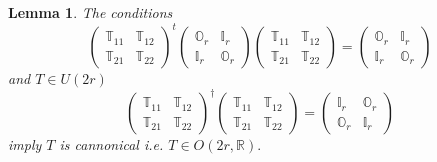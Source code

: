 \documentclass[aps, preprint]{revtex4}
\newtheorem{lemma}[theorem]{Lemma}
\begin{document}
\begin{lemma}
The conditions
\begin{equation}\left (\begin{array}{cc}\mathbb{T}_{1 1} & \mathbb{T}_{1 2} \\
\mathbb{T}_{2 1} & \mathbb{T}_{2 2}\end{array}\right )^{t} \left (\begin{array}{cc}\mathbb{O}_{r} & \mathbb{I}_{r} \\
\mathbb{I}_{r} & \mathbb{O}_{r}\end{array}\right ) \left (\begin{array}{cc}\mathbb{T}_{1 1} & \mathbb{T}_{1 2} \\
\mathbb{T}_{2 1} & \mathbb{T}_{2 2}\end{array}\right ) =\left (\begin{array}{cc}\mathbb{O}_{r} & \mathbb{I}_{r} \\
\mathbb{I}_{r} & \mathbb{O}_{r}\end{array}\right )
\end{equation}and $T \in U \left (2 r\right )$
\begin{equation}\left (\begin{array}{cc}\mathbb{T}_{1 1} & \mathbb{T}_{1 2} \\
\mathbb{T}_{2 1} & \mathbb{T}_{2 2}\end{array}\right )^{ \dag } \left (\begin{array}{cc}\mathbb{T}_{1 1} & \mathbb{T}_{1 2} \\
\mathbb{T}_{2 1} & \mathbb{T}_{2 2}\end{array}\right ) =\left (\begin{array}{cc}\mathbb{I}_{r} & \mathbb{O}_{r} \\
\mathbb{O}_{r} & \mathbb{I}_{r}\end{array}\right )
\end{equation}imply $T$ is cannonical i.e. $T \in O \left (2 r ,\mathbb{R}\right )\text{.}$ 



\end{lemma}
\end{document}
